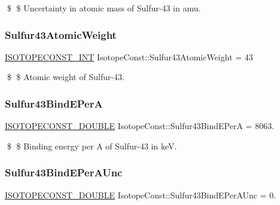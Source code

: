 \$ \$ Uncertainty in atomic mass of Sulfur-\/43 in amu. \mbox{\label{group___isotope_const-_sulfur-_s43_ga7b118200955194e9b7297e656b586294}} 
\subsubsection{\texorpdfstring{Sulfur43\+Atomic\+Weight}{Sulfur43AtomicWeight}}
{\footnotesize\ttfamily \mbox{\hyperlink{group___isotope_const-_macros_ga5f18360b3e99483a35c32d789e62621c}{I\+S\+O\+T\+O\+P\+E\+C\+O\+N\+S\+T\+\_\+\+I\+NT}} Isotope\+Const\+::\+Sulfur43\+Atomic\+Weight = 43}

\$ \$ Atomic weight of Sulfur-\/43. \mbox{\label{group___isotope_const-_sulfur-_s43_ga6407561cb88b4c59f67baa8af0f5d38e}} 
\subsubsection{\texorpdfstring{Sulfur43\+Bind\+E\+PerA}{Sulfur43BindEPerA}}
{\footnotesize\ttfamily \mbox{\hyperlink{group___isotope_const-_macros_ga8f45a7272ce02c0b4c65c44636ed719a}{I\+S\+O\+T\+O\+P\+E\+C\+O\+N\+S\+T\+\_\+\+D\+O\+U\+B\+LE}} Isotope\+Const\+::\+Sulfur43\+Bind\+E\+PerA = 8063.}

\$ \$ Binding energy per A of Sulfur-\/43 in keV. \mbox{\label{group___isotope_const-_sulfur-_s43_ga16c2a85e1856286855964430009191f9}} 
\subsubsection{\texorpdfstring{Sulfur43\+Bind\+E\+Per\+A\+Unc}{Sulfur43BindEPerAUnc}}
{\footnotesize\ttfamily \mbox{\hyperlink{group___isotope_const-_macros_ga8f45a7272ce02c0b4c65c44636ed719a}{I\+S\+O\+T\+O\+P\+E\+C\+O\+N\+S\+T\+\_\+\+D\+O\+U\+B\+LE}} Isotope\+Const\+::\+Sulfur43\+Bind\+E\+Per\+A\+Unc = 0.}

